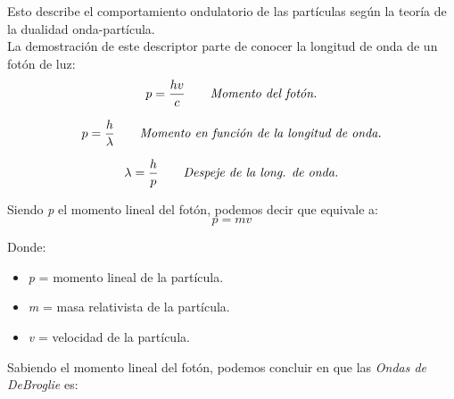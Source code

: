\documentclass[a4paper]{article}
\begin{document}
        \indent Esto describe el comportamiento ondulatorio de las partículas según la teoría de la dualidad onda-partícula. \\

        \indent La demostración de este descriptor parte de conocer la longitud de onda de un fotón de luz: \\

        \begin{equation}
            p = \frac {hv} {c} \tag*{\textit{Momento del fotón.}}  \\
        \end{equation}

        \begin{equation}
            p = \frac {h} {\lambda} \tag*{\textit{Momento en función de la longitud de onda.}} \\
        \end{equation}

        \begin{equation}
            \lambda = \frac {h} {p} \tag*{\textit{Despeje de la long. de onda.}} \\
        \end{equation}

        \indent Siendo \textit{p} el momento lineal del fotón, podemos decir que equivale a: \\

        \begin{equation}
            p = m v \tag*{}
        \end{equation}

        \indent Donde: \\
        \begin{itemize} [itemsep = -1.5em, topsep = 0em, leftmargin = 1cm]
            \item \textit{p} = momento lineal de la partícula. \\
            \item \textit{m} = masa relativista de la partícula. \\
            \item \textit{v} = velocidad de la partícula. \\
        \end{itemize}

        \indent Sabiendo el momento lineal del fotón, podemos concluir en que las \textit{Ondas de DeBroglie} es:

        \newpage
        \noindent
\end{document}
